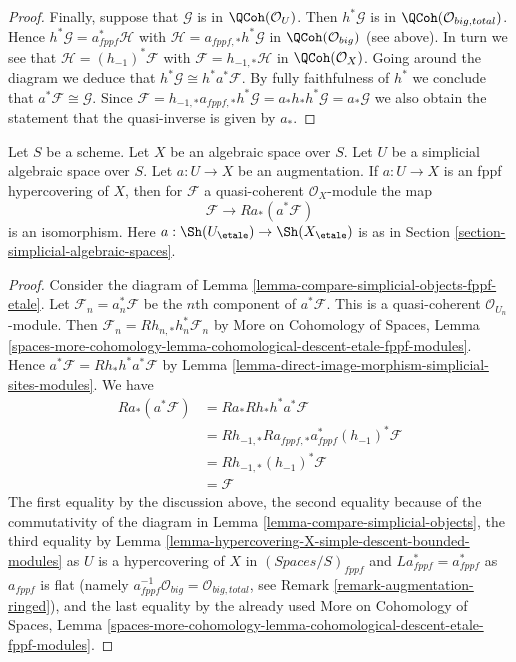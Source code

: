\begin{proof}
\medskip\noindent
Finally, suppose that $\mathcal{G}$ is in $\QCoh(\mathcal{O}_U)$.
Then $h^*\mathcal{G}$ is in $\QCoh(\mathcal{O}_{big, total})$.
Hence $h^*\mathcal{G} = a_{fppf}^*\mathcal{H}$ with
$\mathcal{H} = a_{fppf, *}h^*\mathcal{G}$
in $\QCoh(\mathcal{O}_{big})$ (see above).
In turn we see that $\mathcal{H} = (h_{-1})^*\mathcal{F}$
with $\mathcal{F} = h_{-1, *}\mathcal{H}$ in $\QCoh(\mathcal{O}_X)$.
Going around the diagram we deduce that
$h^*\mathcal{G} \cong h^*a^*\mathcal{F}$.
By fully faithfulness of $h^*$ we conclude that
$a^*\mathcal{F} \cong \mathcal{G}$.
Since $\mathcal{F} = h_{-1, *}a_{fppf, *}h^*\mathcal{G} =
a_*h_*h^*\mathcal{G} = a_*\mathcal{G}$ we also obtain
the statement that the quasi-inverse is given by $a_*$.
\end{proof}

\begin{lemma}
\label{lemma-cohomological-descent-qcoh-for-fppf-hypercovering}
Let $S$ be a scheme. Let $X$ be an algebraic space over $S$.
Let $U$ be a simplicial algebraic space over $S$. Let $a : U \to X$
be an augmentation. If $a : U \to X$ is an fppf hypercovering of $X$,
then for $\mathcal{F}$ a quasi-coherent $\mathcal{O}_X$-module
the map
$$
\mathcal{F} \to Ra_*(a^*\mathcal{F})
$$
is an isomorphism. Here $a : \Sh(U_\etale) \to \Sh(X_\etale)$
is as in Section \ref{section-simplicial-algebraic-spaces}.
\end{lemma}

\begin{proof}
Consider the diagram of Lemma \ref{lemma-compare-simplicial-objects-fppf-etale}.
Let $\mathcal{F}_n = a_n^*\mathcal{F}$ be the $n$th component of
$a^*\mathcal{F}$. This is a quasi-coherent $\mathcal{O}_{U_n}$-module.
Then $\mathcal{F}_n = Rh_{n, *}h_n^*\mathcal{F}_n$
by More on Cohomology of Spaces, Lemma
\ref{spaces-more-cohomology-lemma-cohomological-descent-etale-fppf-modules}.
Hence $a^*\mathcal{F} = Rh_*h^*a^*\mathcal{F}$ by
Lemma \ref{lemma-direct-image-morphism-simplicial-sites-modules}.
We have
\begin{align*}
Ra_*(a^*\mathcal{F})
& =
Ra_*Rh_*h^*a^*\mathcal{F} \\
& =
Rh_{-1, *}Ra_{fppf, *}a_{fppf}^*(h_{-1})^*\mathcal{F} \\
& =
Rh_{-1, *}(h_{-1})^*\mathcal{F} \\
& =
\mathcal{F}
\end{align*}
The first equality by the discussion above, the second equality
because of the commutativity of the diagram in
Lemma \ref{lemma-compare-simplicial-objects}, the third equality by
Lemma \ref{lemma-hypercovering-X-simple-descent-bounded-modules}
as $U$ is a hypercovering of $X$ in $(\textit{Spaces}/S)_{fppf}$
and $La_{fppf}^* = a_{fppf}^*$ as $a_{fppf}$ is flat
(namely $a_{fppf}^{-1}\mathcal{O}_{big} = \mathcal{O}_{big, total}$,
see Remark \ref{remark-augmentation-ringed}), and
the last equality by the already used
More on Cohomology of Spaces, Lemma
\ref{spaces-more-cohomology-lemma-cohomological-descent-etale-fppf-modules}.
\end{proof}

